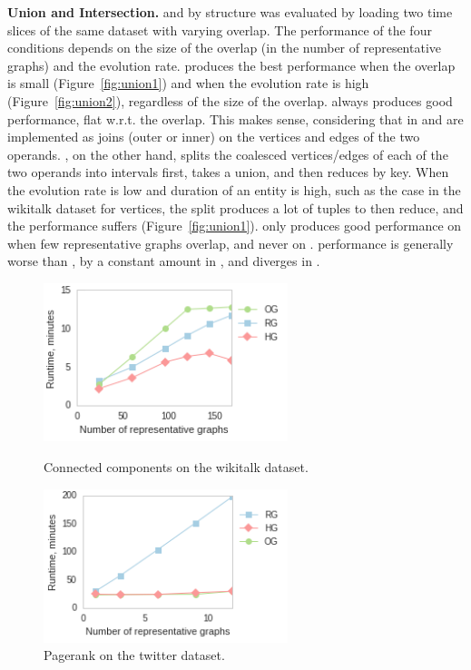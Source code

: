 {\bf Union and Intersection.}   and 
by structure was evaluated by loading two time slices of the same
dataset with varying overlap.  The performance of the four conditions
depends on the size of the overlap (in the number of representative
graphs) and the evolution rate.  \ve produces the best performance
when the overlap is small (Figure~\ref{fig:union1}) and when the
evolution rate is high (Figure~\ref{fig:union2}), regardless of the
size of the overlap.  \og always produces good performance, flat
w.r.t. the overlap.  This makes sense, considering that in \og
{} and  are implemented as joins (outer
or inner) on the vertices and edges of the two operands.  \ve, on the
other hand, splits the coalesced vertices/edges of each of the two
operands into intervals first, takes a union, and then reduces by key.
When the evolution rate is low and duration of an entity is high, such
as the case in the wikitalk dataset for vertices, the split produces a
lot of tuples to then reduce, and the performance suffers
(Figure~\ref{fig:union1}). \sg only produces good performance on
 when few representative graphs overlap, and never
on . \hg performance is generally worse than \og, by a
constant amount in , and diverges in
.

\begin{figure}[h]
\centering
\begin{minipage}{3.3in}
\centering
\includegraphics[width=2.8in]{figs/cc_wikitalk_build12.png}
\caption{Connected components on the wikitalk dataset.}
\label{fig:ccwiki}
\end{minipage}
\begin{minipage}{3.3in}
\centering
\includegraphics[width=2.8in]{figs/prank_twitter_build12.png}
\caption{Pagerank on the twitter dataset.}
\label{fig:pranktwitter}
\end{minipage}
\end{figure}

